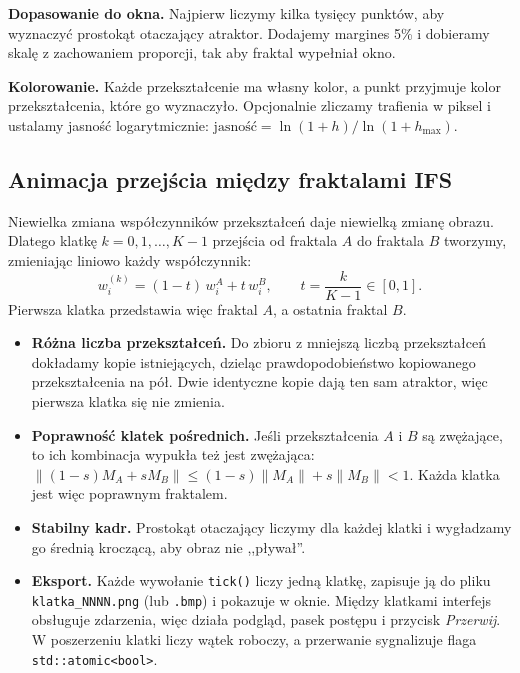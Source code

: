 \documentclass[11pt,a4paper]{article}
\newcommand{\kod}[1]{\texttt{#1}}
\begin{document}
\textbf{Dopasowanie do okna.} Najpierw liczymy kilka tysięcy punktów, aby
wyznaczyć prostokąt otaczający atraktor. Dodajemy margines 5\% i dobieramy
skalę z zachowaniem proporcji, tak aby fraktal wypełniał okno.

\textbf{Kolorowanie.} Każde przekształcenie ma własny kolor, a punkt
przyjmuje kolor przekształcenia, które go wyznaczyło. Opcjonalnie zliczamy
trafienia w piksel i ustalamy jasność logarytmicznie:
$\mathrm{jasność} = \ln(1 + h) / \ln(1 + h_{\max})$.

\subsection{Animacja przejścia między fraktalami IFS}

Niewielka zmiana współczynników przekształceń daje niewielką zmianę obrazu.
Dlatego klatkę $k = 0, 1, \ldots, K-1$ przejścia od fraktala $A$ do fraktala
$B$ tworzymy, zmieniając liniowo każdy współczynnik:
\[
  w_i^{(k)} = (1 - t)\, w_i^{A} + t\, w_i^{B},
  \qquad t = \frac{k}{K-1} \in [0, 1] .
\]
Pierwsza klatka przedstawia więc fraktal $A$, a ostatnia fraktal $B$.

\begin{itemize}
  \item \textbf{Różna liczba przekształceń.} Do zbioru z mniejszą liczbą
        przekształceń dokładamy kopie istniejących, dzieląc prawdopodobieństwo
        kopiowanego przekształcenia na pół. Dwie identyczne kopie dają ten sam
        atraktor, więc pierwsza klatka się nie zmienia.
  \item \textbf{Poprawność klatek pośrednich.} Jeśli przekształcenia $A$ i $B$
        są zwężające, to ich kombinacja wypukła też jest zwężająca:
        $\lVert (1-s)M_A + s M_B \rVert \le (1-s)\lVert M_A \rVert
        + s\lVert M_B \rVert < 1$. Każda klatka jest więc poprawnym fraktalem.
  \item \textbf{Stabilny kadr.} Prostokąt otaczający liczymy dla każdej klatki
        i wygładzamy go średnią kroczącą, aby obraz nie ,,pływał''.
  \item \textbf{Eksport.} Każde wywołanie \kod{tick()} liczy jedną klatkę,
        zapisuje ją do pliku \kod{klatka\_NNNN.png} (lub \kod{.bmp})
        i pokazuje w oknie. Między klatkami interfejs obsługuje zdarzenia,
        więc działa podgląd, pasek postępu i przycisk \textit{Przerwij}.
        W poszerzeniu klatki liczy wątek roboczy, a przerwanie sygnalizuje
        flaga \kod{std::atomic<bool>}.
\end{itemize}
\end{document}
